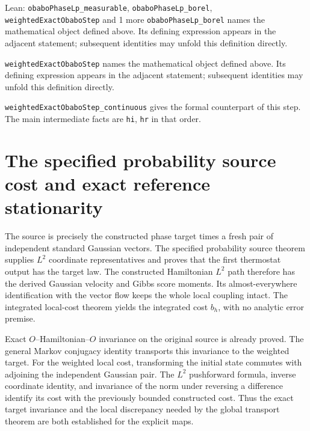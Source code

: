 \documentclass[11pt,a4paper]{article}
\begin{document}
\begin{leanbox}{Lean: \texttt{obaboPhaseLp\_\allowbreak{}measurable}, \texttt{obaboPhaseLp\_\allowbreak{}borel}, \texttt{weightedExactObaboStep} and 1 more}
\texttt{obabo\allowbreak{}Phase\allowbreak{}Lp\_\allowbreak{}borel} names the mathematical object defined above. Its defining expression appears in the adjacent statement; subsequent identities may unfold this definition directly.




\texttt{weighted\allowbreak{}Exact\allowbreak{}Obabo\allowbreak{}Step} names the mathematical object defined above. Its defining expression appears in the adjacent statement; subsequent identities may unfold this definition directly.




\texttt{weighted\allowbreak{}Exact\allowbreak{}Obabo\allowbreak{}Step\_\allowbreak{}continuous} gives the formal counterpart of this step. The main intermediate facts are \texttt{hi}, \texttt{hr} in that order.
\end{leanbox}

\section{\texorpdfstring{The specified probability source cost and exact reference stationarity}{The specified probability source cost and exact reference stationarity}}


The source is precisely the constructed phase target times a fresh pair of independent standard Gaussian vectors. The specified probability source theorem supplies \(L^{2}\) coordinate representatives and proves that the first thermostat output has the target law. The constructed Hamiltonian \(L^{2}\) path therefore has the derived Gaussian velocity and Gibbs score moments. Its almost-everywhere identification with the vector flow keeps the whole local coupling intact. The integrated local-cost theorem yields the integrated cost \(b_h\), with no analytic error premise.



Exact \(O\)–Hamiltonian–\(O\) invariance on the original source is already proved. The general Markov conjugacy identity transports this invariance to the weighted target. For the weighted local cost, transforming the initial state commutes with adjoining the independent Gaussian pair. The \(L^{2}\) pushforward formula, inverse coordinate identity, and invariance of the norm under reversing a difference identify its cost with the previously bounded constructed cost. Thus the exact target invariance and the local discrepancy needed by the global transport theorem are both established for the explicit maps.
\end{document}
